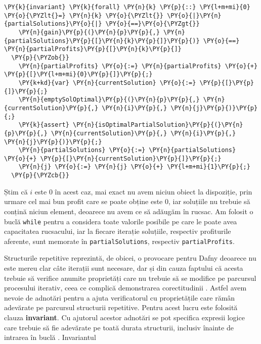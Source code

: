 \begin{sloppypar}
\begin{Verbatim}[commandchars=\\\{\}]
  \PY{k}{invariant} \PY{k}{forall} \PY{n}{k} \PY{p}{::} \PY{l+m+mi}{0} \PY{o}{\PYZlt{}=} \PY{n}{k} \PY{o}{\PYZlt{}} \PY{o}{|}\PY{n}{partialSolutions}\PY{o}{|} \PY{o}{==}\PY{o}{\PYZgt{}} 
    \PY{n}{gain}\PY{p}{(}\PY{n}{p}\PY{p}{,} \PY{n}{partialSolutions}\PY{p}{[}\PY{n}{k}\PY{p}{]}\PY{p}{)} \PY{o}{==} \PY{n}{partialProfits}\PY{p}{[}\PY{n}{k}\PY{p}{]}
  \PY{p}{\PYZob{}}
    \PY{n}{partialProfits} \PY{o}{:=} \PY{n}{partialProfits} \PY{o}{+} \PY{p}{[}\PY{l+m+mi}{0}\PY{p}{]}\PY{p}{;}
    \PY{k+kd}{var} \PY{n}{currentSolution} \PY{o}{:=} \PY{p}{[}\PY{p}{]}\PY{p}{;}
    \PY{n}{emptySolOptimal}\PY{p}{(}\PY{n}{p}\PY{p}{,} \PY{n}{currentSolution}\PY{p}{,} \PY{n}{i}\PY{p}{,} \PY{n}{j}\PY{p}{)}\PY{p}{;}
    \PY{k}{assert} \PY{n}{isOptimalPartialSolution}\PY{p}{(}\PY{n}{p}\PY{p}{,} \PY{n}{currentSolution}\PY{p}{,} \PY{n}{i}\PY{p}{,} \PY{n}{j}\PY{p}{)}\PY{p}{;}
    \PY{n}{partialSolutions} \PY{o}{:=} \PY{n}{partialSolutions} \PY{o}{+} \PY{p}{[}\PY{n}{currentSolution}\PY{p}{]}\PY{p}{;}
    \PY{n}{j} \PY{o}{:=} \PY{n}{j} \PY{o}{+} \PY{l+m+mi}{1}\PY{p}{;}
  \PY{p}{\PYZcb{}}
\end{Verbatim}
    \par Știm că $i$ este 0 în acest caz, mai exact nu avem niciun obiect la dispoziție, prin urmare cel mai bun profit care se poate obține este 0, iar soluțiile nu trebuie să conțină niciun element, deoarece nu avem ce să adăugăm în rucsac. Am folosit o buclă \texttt{while} pentru a considera toate valorile posibile pe care le poate avea capacitatea rucsacului, iar la fiecare iterație soluțiile, respectiv profiturile aferente, sunt memorate în \texttt{partialSolutions}, respectiv \texttt{partialProfits}. \par
    Structurile repetitive reprezintă, de obicei, o provocare pentru Dafny deoarece nu este mereu clar câte iterații sunt necesare, dar și din cauza faptului că acesta trebuie să verifice anumite proprietăți care nu trebuie să se modifice pe parcursul procesului iterativ, ceea ce complică demonstrarea corectitudinii \cite{DBLP:series/natosec/KoenigL12}. Astfel avem nevoie de adnotări pentru a ajuta verificatorul cu proprietățile care rămân adevărate pe parcursul structurii repetitive. Pentru acest lucru este folosită clauza \textbf{invariant}. Cu ajutorul acestor adnotări se pot specifica expresii logice care trebuie să fie adevărate pe toată durata structurii, inclusiv înainte de intrarea în buclă \cite{DBLP:series/natosec/KoenigL12}. Invariantul
    \begin{Verbatim}[commandchars=\\\{\}]

\end{Verbatim}
\end{sloppypar}
